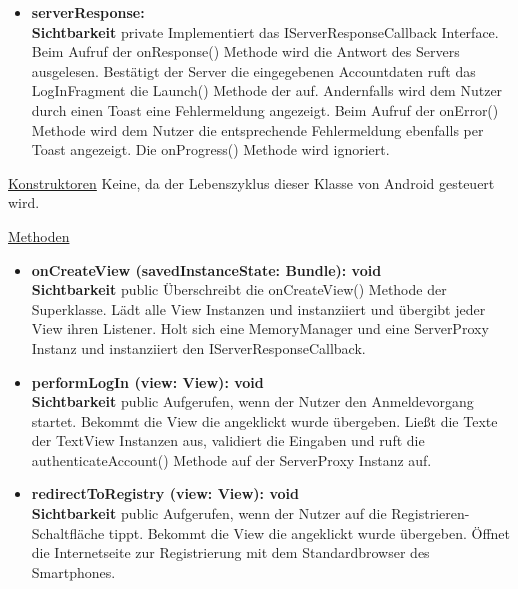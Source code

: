 \begin{itemize}
\item \textbf{serverResponse: } \hfill\\ \textbf{Sichtbarkeit} private \newline
Implementiert das IServerResponseCallback Interface. Beim Aufruf der onResponse() Methode wird die Antwort des Servers ausgelesen. Bestätigt der Server die eingegebenen Accountdaten ruft das LogInFragment die Launch() Methode der  auf. Andernfalls wird dem Nutzer durch einen Toast eine Fehlermeldung angezeigt. Beim Aufruf der onError() Methode wird dem Nutzer die entsprechende Fehlermeldung ebenfalls per Toast angezeigt. Die onProgress() Methode wird ignoriert.

\end{itemize}

\underline{Konstruktoren}\newline
\indent Keine, da der Lebenszyklus dieser Klasse von Android gesteuert wird.\newline

\underline{Methoden}
\begin{itemize}
\itemsep0pt
\item \textbf{onCreateView (savedInstanceState: Bundle): void}\hfill\\
\textbf{Sichtbarkeit} public\newline
Überschreibt die onCreateView() Methode der Superklasse. Lädt alle View Instanzen und instanziiert und übergibt jeder View ihren Listener. Holt sich eine MemoryManager und eine ServerProxy Instanz und instanziiert den IServerResponseCallback.

\item \textbf{performLogIn (view: View): void}\hfill\\
\textbf{Sichtbarkeit} public\newline
Aufgerufen, wenn der Nutzer den Anmeldevorgang startet. Bekommt die View die angeklickt wurde übergeben. Ließt die Texte der TextView Instanzen aus, validiert die Eingaben und ruft die authenticateAccount() Methode auf der ServerProxy Instanz auf. 

\item \textbf{redirectToRegistry (view: View): void}\hfill\\
\textbf{Sichtbarkeit} public\newline
Aufgerufen, wenn der Nutzer auf die Registrieren-Schaltfläche tippt. Bekommt die View die angeklickt wurde übergeben. Öffnet die Internetseite zur Registrierung mit dem Standardbrowser des Smartphones.

\end{itemize}